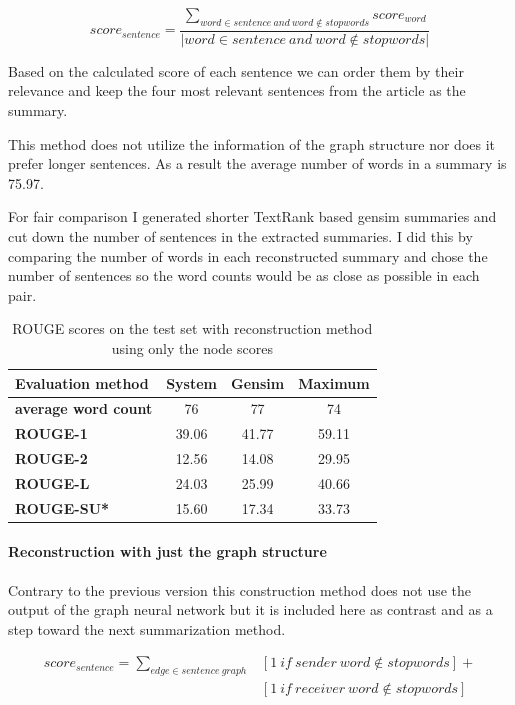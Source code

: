 \[score_{sentence} = \frac{\sum_{word \in sentence\ and\ word \notin stopwords} score_{word}}{|word \in sentence\ and\ word \notin stopwords|}\]

Based on the calculated score of each sentence we can order them by their relevance and keep the four most relevant sentences from the article as the summary.

This method does not utilize the information of the graph structure nor does it prefer longer sentences. As a result the average number of words in a summary is 75.97.

For fair comparison I generated shorter TextRank based gensim summaries and cut down the number of sentences in the extracted summaries. I did this by comparing the number of words in each reconstructed summary and chose the number of sentences so the word counts would be as close as possible in each pair.

\begin{table}[!ht]
	\centering
	\begin{tabular}{| l | c | c | c |}
		\hline
		\textbf{Evaluation method}&\textbf{System}&\textbf{Gensim}&\textbf{Maximum}\\ \hline \hline
		\textbf{average word count}&76&77&74 \\ \hline
		\textbf{ROUGE-1}&39.06&41.77&59.11 \\ \hline
		\textbf{ROUGE-2}&12.56&14.08&29.95 \\ \hline
		\textbf{ROUGE-L}&24.03&25.99&40.66 \\ \hline
		\textbf{ROUGE-SU*}&15.60&17.34&33.73 \\ \hline
	\end{tabular}
	\caption{ROUGE scores on the test set with reconstruction method using only the node scores}
	\label{tab:simple_node}
\end{table}
\FloatBarrier

\paragraph{Reconstruction with just the graph structure}

Contrary to the previous version this construction method does not use the output of the graph neural network but it is included here as contrast and as a step toward the next summarization method.

\begin{eqnarray*}
	score_{sentence} = \sum_{edge \in sentence\ graph} &[1\ if\ sender\ word \notin stopwords] + \\&[1\ if\ receiver\ word \notin stopwords]
\end{eqnarray*}


